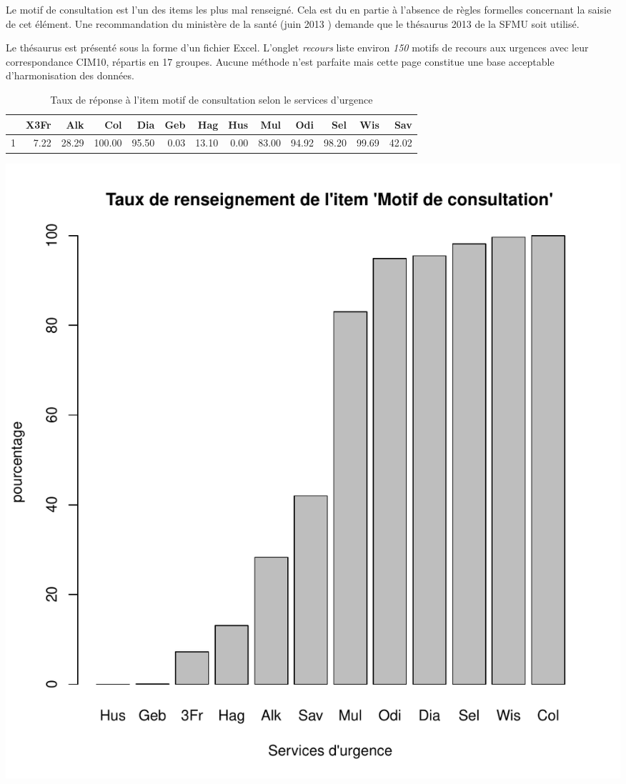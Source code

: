 \documentclass[12pt,english,french,twoside]{book}\usepackage[]{graphicx}\usepackage[]{color}
\makeatletter
\def\maxwidth{ %
  \ifdim\Gin@nat@width>\linewidth
    \linewidth
  \else
    \Gin@nat@width
  \fi
}
\makeatother
\begin{document}
Le motif de consultation est l'un des items les plus mal renseigné. Cela est du en partie à l'absence de règles formelles concernant la saisie de cet élément. Une recommandation du ministère de la santé (juin 2013 \cite{12,13}) demande que le thésaurus 2013 de la SFMU \cite{9} soit utilisé.

Le thésaurus est présenté sous la forme d'un fichier Excel. L'onglet \emph{recours} liste environ \emph{150} motifs de recours aux urgences avec leur correspondance CIM10, répartis en 17 groupes. Aucune méthode n'est parfaite mais cette page constitue une base acceptable d'harmonisation des données.


\begin{table}[ht]
\centering
\begin{tabular}{rrrrrrrrrrrrr}
  \hline
 & X3Fr & Alk & Col & Dia & Geb & Hag & Hus & Mul & Odi & Sel & Wis & Sav \\ 
  \hline
1 & 7.22 & 28.29 & 100.00 & 95.50 & 0.03 & 13.10 & 0.00 & 83.00 & 94.92 & 98.20 & 99.69 & 42.02 \\ 
   \hline
\end{tabular}
\caption[motif de consultation]{Taux de réponse à l'item motif de consultation selon le services d'urgence} 
\label{lab:motif}
\end{table}

\includegraphics[width=\maxwidth]{figure/motifss1} 
\end{document}
